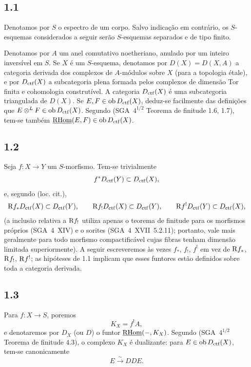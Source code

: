\subsection*{1.1}
Denotamos por $S$ o espectro de um corpo. Salvo indicação em contrário, os $S$-esquemas considerados a seguir serão $S$-esquemas separados e de tipo finito.

Denotamos por $A$ um anel comutativo noetheriano, anulado por um inteiro inversível em $S$. Se $X$ é um $S$-esquema, denotamos por $D(X)=D(X,A)$ a categoria derivada dos complexos de $A$-módulos sobre $X$ (para a topologia étale), e por $D_{\mathrm{ctf}}(X)$ a subcategoria plena formada pelos complexos de dimensão Tor finita e cohomologia construtível. A categoria $D_{\mathrm{ctf}}(X)$ é uma subcategoria triangulada de $D(X)$. Se $E,F \in \operatorname{ob} D_{\mathrm{ctf}}(X)$, deduz-se facilmente das definições que $E \otimes^{L} F \in \operatorname{ob} D_{\mathrm{ctf}}(X)$. Segundo (SGA~$4^{1/2}$ Teorema de finitude 1.6, 1.7), tem-se também $\underline{\mathrm{RHom}}(E,F) \in \operatorname{ob} D_{\mathrm{ctf}}(X)$.

\subsection*{1.2}
Seja $f:X\to Y$ um $S$-morfismo. Tem-se trivialmente
\[
f^{*}D_{\mathrm{ctf}}(Y) \subset D_{\mathrm{ctf}}(X),
\]
e, segundo (loc. cit.),
\[
\mathrm{R} f_{*}D_{\mathrm{ctf}}(X) \subset D_{\mathrm{ctf}}(Y),\qquad
\mathrm{R} f_{!}D_{\mathrm{ctf}}(X) \subset D_{\mathrm{ctf}}(Y),\qquad
\mathrm{R} f^{!}D_{\mathrm{ctf}}(Y) \subset D_{\mathrm{ctf}}(X),
\]
(a inclusão relativa a $\mathrm{R} f_{!}$ utiliza apenas o teorema de finitude para os morfismos próprios (SGA~4~XIV) e o sorites (SGA~4~XVII~5.2.11); portanto, vale mais geralmente para todo morfismo compactificável cujas fibras tenham dimensão limitada superiormente). A seguir escreveremos às vezes $f_{*}$, $f_{!}$, $f^{!}$ em vez de $\mathrm{R} f_{*}$, $\mathrm{R} f_{!}$, $\mathrm{R} f^{!}$; as hipóteses de 1.1 implicam que esses funtores estão definidos sobre toda a categoria derivada.

\subsection*{1.3}
Para $f:X\to S$, poremos
\[
K_X=f^{!}A,
\]
e denotaremos por $D_X$ (ou $D$) o funtor $\underline{\mathrm{RHom}}(-,K_X)$. Segundo (SGA~$4^{1/2}$ Teorema de finitude 4.3), o complexo $K_X$ é dualizante: para $E\in\operatorname{ob} D_{\mathrm{ctf}}(X)$, tem-se canonicamente
\[
E \xrightarrow{\sim} DDE.
\]

